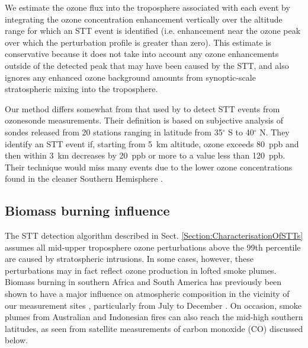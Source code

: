 \documentclass[acp, manuscript]{copernicus} %
\providecommand{\DIFadd}[1]{{\protect\color{blue}\uwave{#1}}} %
\providecommand{\DIFaddbegin}{} %
\providecommand{\DIFaddend}{} %
\begin{document}
    We estimate the ozone flux into the troposphere associated with each event by integrating the ozone concentration enhancement vertically over the altitude range for which an STT event is identified (i.e. enhancement near the ozone peak over which the perturbation profile is greater than zero).
    This estimate is conservative because it does not take into account any ozone enhancements outside of the detected peak that may have been caused by the STT, and also ignores any enhanced ozone background amounts from synoptic-scale stratospheric mixing into the troposphere.

    Our method differs somewhat from that used by \citet{Tang2010} to detect STT events from ozonesonde measurements. 
    Their definition is based on subjective analysis of sondes released from 20 stations ranging in latitude from 35$^\circ$ S to 40$^\circ$ N.
    They identify an STT event if, starting from 5~km altitude, ozone exceeds 80~ppb and then within 3~km decreases by 20~ppb or more to a value less than 120~ppb.
    Their technique would miss many events due to the lower ozone concentrations found in the cleaner Southern Hemisphere \DIFaddbegin \DIFadd{(SH)}\DIFaddend .

  \subsection{Biomass burning influence}
  \label{Section:BiomassBurning}
    The STT detection algorithm described in Sect. \ref{Section:CharacterisationOfSTTs} assumes all mid-upper troposphere ozone perturbations above the 99th percentile are caused by stratospheric intrusions. 
    In some cases, however, these perturbations may in fact reflect ozone production in lofted smoke plumes.
    Biomass burning in southern Africa and South America has previously been shown to have a major influence on atmospheric composition in the vicinity of our measurement sites \citep{Oltmans2001, Gloudemans2006, Edwards2006}, particularly from July to December \citep{Pak2003, Liu2016}.
    On occasion, smoke plumes from Australian and Indonesian fires can also reach the mid-high southern latitudes, as seen from satellite measurements of carbon monoxide (CO) discussed below. %
\end{document}
